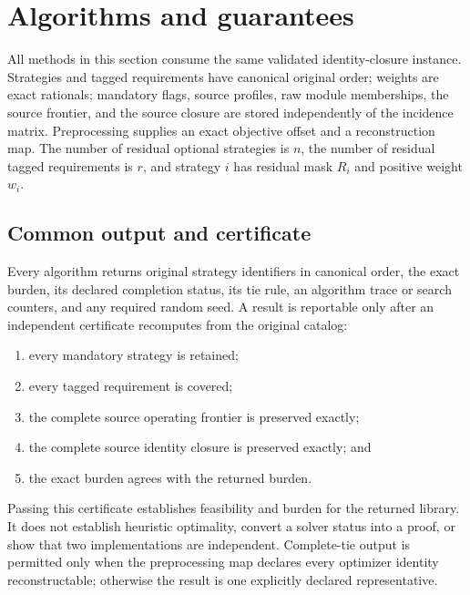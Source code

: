 \section{Algorithms and guarantees}
\label{sec:algorithms}

All methods in this section consume the same validated
identity-closure instance.  Strategies and tagged requirements have canonical
original order; weights are exact rationals; mandatory flags, source profiles,
raw module memberships, the source frontier, and the source closure are stored
independently of the incidence matrix.  Preprocessing supplies an exact
objective offset and a reconstruction map.  The number of residual optional
strategies is \(n\), the number of residual tagged requirements is \(r\), and
strategy \(i\) has residual mask \(R_i\) and positive weight \(w_i\).



\subsection{Common output and certificate}
\label{subsec:aor-common-certificate}

Every algorithm returns original strategy identifiers in canonical order, the
exact burden, its declared completion status, its tie rule, an algorithm trace
or search counters, and any required random seed.  A result is reportable only
after an independent certificate recomputes from the original catalog:
\begin{enumerate}
 \item every mandatory strategy is retained;
 \item every tagged requirement is covered;
 \item the complete source operating frontier is preserved exactly;
 \item the complete source identity closure is preserved exactly; and
 \item the exact burden agrees with the returned burden.
\end{enumerate}
Passing this certificate establishes feasibility and burden for the returned
library.  It does not establish heuristic optimality, convert a solver status
into a proof, or show that two implementations are independent.  Complete-tie
output is permitted only when the preprocessing map declares every optimizer
identity reconstructable; otherwise the result is one explicitly declared
representative.

\AORAlgorithmGuaranteeTable

